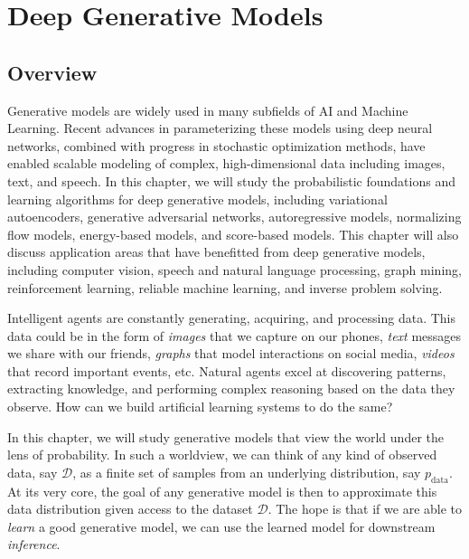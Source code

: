 ﻿

\chapter{Deep Generative Models}
\setcounter{section}{-1}

\section{Overview}

Generative models are widely used in many subfields of AI and Machine Learning. Recent 
advances in parameterizing these models using deep neural networks, combined with 
progress in stochastic optimization methods, have enabled scalable modeling of complex, 
high-dimensional data including images, text, and speech. In this chapter, we will 
study the probabilistic foundations and learning algorithms for deep generative models, 
including variational autoencoders, generative adversarial networks, autoregressive 
models, normalizing flow models, energy-based models, and score-based models. This 
chapter will also discuss application areas that have benefitted from deep generative 
models, including computer vision, speech and natural language processing, graph mining, 
reinforcement learning, reliable machine learning, and inverse problem solving.

Intelligent agents are constantly generating, acquiring, and processing
data. This data could be in the form of {\em images} that we capture on our
phones, {\em text} messages we share with our friends, {\em graphs} that model
interactions on social media, {\em videos} that record important events,
etc. Natural agents excel at discovering patterns, extracting
knowledge, and performing complex reasoning based on the data they observe. How
can we build artificial learning systems to do the same?

In this chapter, we will study generative models that view the world under the lens of probability.
In such a worldview, we can think of any kind of
observed data, say $\mathcal{D}$, as a finite set of samples from an
underlying distribution, say $p_{\mathrm{data}}$. At its very core, the
goal of any generative model is then to approximate this data
distribution given access to the dataset $\mathcal{D}$. The hope is that
if we are able to {\em learn} a good generative model, we can use the
learned model for downstream {\em inference}.


